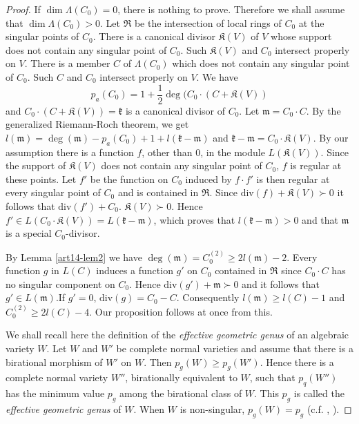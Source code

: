 \begin{proof}
If $\dim \Lambda(C_{0})=0$, there is nothing to prove. Therefore we shall assume that $\dim \Lambda (C_{0})>0$. Let $\mathfrak{R}$ be the intersection of local rings of $C_{0}$ at the singular points of $C_{0}$. There is a canonical divisor $\mathfrak{K}(V)$ of $V$ whose support does not contain any singular point of $C_{0}$. Such $\mathfrak{K}(V)$ and $C_{0}$ intersect properly on $V$. There is a member $C$ of $\Lambda (C_{0})$ which does not contain any singular point of $C_{0}$. Such $C$ and $C_{0}$ intersect properly on $V$. We have 
$$
p_{a}(C_{0})=1+\frac{1}{2}\deg (C_{0}\cdot (C+\mathfrak{K}(V))
$$
and $C_{0}\cdot (C+\mathfrak{K}(V))=\mathfrak{k}$ is a canonical divisor of $C_{0}$. Let $\mathfrak{m}=C_{0}\cdot C$. By the generalized Riemann-Roch theorem, we get $l(\mathfrak{m})=\deg (\mathfrak{m})-p_{a}(C_{0})+1+l(\mathfrak{k}-\mathfrak{m})$ and $\mathfrak{k}-\mathfrak{m}=C_{0}\cdot \mathfrak{K}(V)$. By our assumption there is a function $f$, other than $0$, in the module $L(\mathfrak{K}(V))$. Since the support of $\mathfrak{K}(V)$ does not contain any singular point of $C_{0}$, $f$ is regular at these points. Let $f'$ be the function on $C_{0}$ induced by $f\cdot f'$ is then regular at every singular point of $C_{0}$ and is contained in $\mathfrak{R}$. Since $\text{div} (f)+\mathfrak{K}(V)\succ 0$ it follows that $\text{div}(f')+C_{0}$. $\mathfrak{K}(V)\succ 0$. Hence $f'\in L(C_{0}\cdot \mathfrak{K}(V))=L(\mathfrak{k}-\mathfrak{m})$, which proves that $l(\mathfrak{k}-\mathfrak{m})>0$ and that $\mathfrak{m}$ is a special $C_{0}$-divisor.

By Lemma \ref{art14-lem2} we have $\deg (\mathfrak{m})=C^{(2)}_{0}\geq 2l(\mathfrak{m})-2$. Every function $g$ in $L(C)$ induces a function $g'$ on $C_{0}$ contained in $\mathfrak{R}$ since $C_{0}\cdot C$ has no singular component on $C_{0}$. Hence $\text{div} (g')+\mathfrak{m}\succ 0$ and it follows that $g'\in L(\mathfrak{m})$.\pageoriginale If $g'=0$, $\text{div}(g)=C_{0}-C$. Consequently $l(\mathfrak{m})\geq l(C)-1$ and $C^{(2)}_{0}\geq 2l(C)-4$. Our proposition follows at once from this.

We shall recall here the definition of the {\em effective geometric genus} of an algebraic variety $W$. Let $W$ and $W'$ be complete normal varieties and assume that there is a birational morphism of $W'$ on $W$. Then $p_{g}(W)\geq p_{g}(W')$. Hence there is a complete normal variety $W''$, birationally equivalent to $W$, such that $p_{q}(W'')$ has the minimum value $p_{g}$ among the birational class of $W$. This $p_{g}$ is called the {\em effective geometric genus} of $W$. When $W$ is non-singular, $p_{g}(W)=p_{g}$ (c.f. \cite{art14-key13}, \cite{art14-key31}).
\end{proof}

